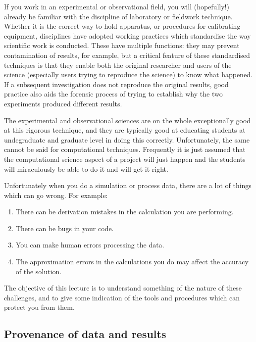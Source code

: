 \documentclass[a4paper,12pt]{article}
\theoremstyle{definition}
\begin{document}
If you work in an experimental or observational field, you will (hopefully!)
already be familiar with the discipline of laboratory or fieldwork
technique. Whether it is the correct way to hold apparatus, or procedures
for calibrating equipment, disciplines have adopted working practices which
standardise the way scientific work is conducted. These have multiple
functions: they may prevent contamination of results, for example, but a
critical feature of these standardised techniques is that they enable both
the original researcher and users of the science (especially users trying to
reproduce the science) to know what happened. If a subsequent investigation
does not reproduce the original results, good practice also aids the
forensic process of trying to establish why the two experiments produced
different results.

The experimental and observational sciences are on the whole exceptionally
good at this rigorous technique, and they are typically good at educating
students at undegraduate and graduate level in doing this
correctly. Unfortunately, the same cannot be said for computational
techniques. Frequently it is just assumed that the computational science
aspect of a project will just happen and the students will miraculously be
able to do it and will get it right.

Unfortunately when you do a simulation or process data, there are a lot of
things which can go wrong. For example:
\begin{enumerate}
\item There can be derivation mistakes in the calculation you are performing.
\item There can be bugs in your code.
\item You can make human errors processing the data.
\item The approximation errors in the calculations you do may affect the
  accuracy of the solution.
\end{enumerate}
The objective of this lecture is to understand something of the nature of
these challenges, and to give some indication of the tools and procedures
which can protect you from them.

\subsection{Provenance of data and results}
\end{document}
